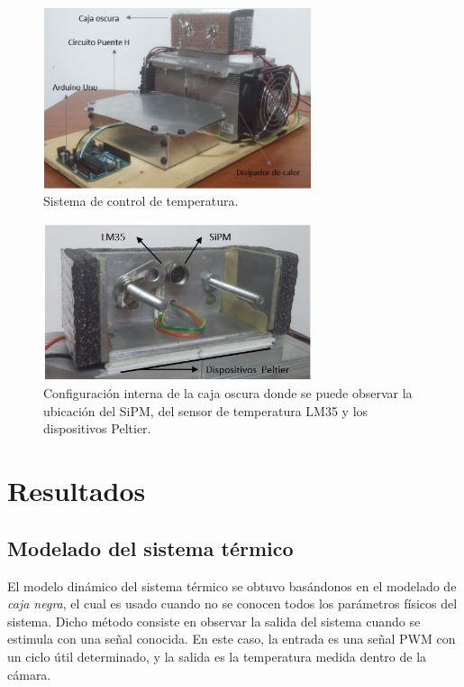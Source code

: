 \documentclass[runningheads]{llncs}
\begin{document}
\begin{figure}[ht]
\includegraphics[width=0.7\textwidth]{Sistema_termico.JPG}
\centering
\caption{Sistema de control de temperatura.} 
\label{Sistema_experimental}
\end{figure}

\begin{figure}[ht]
\includegraphics[width=0.7\textwidth]{caja.JPG}
\centering
\caption{Configuración interna de la caja oscura donde se puede observar la ubicación del SiPM, del sensor de temperatura LM35 y los dispositivos Peltier.} 
\label{caja}
\end{figure}
\section{Resultados}
\subsection{Modelado del sistema térmico}
El modelo dinámico del sistema térmico se obtuvo basándonos en el modelado de \textit{caja negra}, el cual es usado cuando no se conocen todos los parámetros físicos del sistema. Dicho método consiste en observar la salida del sistema cuando se estimula con una señal conocida. En este caso, la entrada es una señal PWM con un ciclo útil determinado, y la salida es la temperatura medida dentro de la cámara.  
\end{document}
